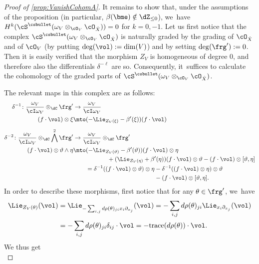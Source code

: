 \begin{proof}[Proof of \cref{prop:VanishCohomA}]
It remains to show that, under the assumptions of the pro\-position (in particular, $\beta(\bme)\notin \dZ_{\leq 0}$), we~have $H^k(\cS^{\csbullet}(\omega_V\otimes_{\cO_V} \cO_{\hat{X}}))=0$ for $k=0,-1$. Let us first notice that the complex $\cS^{\csbullet}(\omega_V\otimes_{\cO_V}\cO_{\hat{X}})$
is naturally graded by the grading of $\cO_{\hat{X}}$ and of $\cO_V$ (by putting $\deg(\vol):=\dim(V)$) and by setting $\deg(\frg'):=0$.
Then it is easily verified that the morphism $Z_V$ is homogeneous of degree $0$, and therefore also the differentials $\delta^{-\ell}$ are so. Consequently, it~suffices to calculate the cohomology of the graded parts of $\cS^{\csbullet}(\omega_V\otimes_{\cO_V}\cO_{\hat{X}})$.

The relevant maps in this complex are as follows:
\begin{align*}
\delta^{-1} \colon \frac{\omega_V}{\cI\omega_V}\otimes_\dC \frg'
&\to
\frac{\omega_V}{\cI\omega_V}
\\
(f\cdot \vol)\otimes \xi & \mto (-\Lie_{Z_V(\xi)}-\beta'(\xi))(f\cdot \vol)
\\[5pt]
\delta^{-2} \colon \frac{\omega_V}{\cI\omega_V}\otimes_\dC \bigwedge^2 \frg'
&\to
\frac{\omega_V}{\cI\omega_V}\otimes_\dC \frg'
\\
(f\cdot \vol)\otimes\vartheta\wedge\eta &\mto
(-\Lie_{Z_V(\vartheta)}-\beta'(\vartheta))(f\cdot \vol)\otimes \eta
\\
&
\hspace*{2cm}+(\Lie_{Z_V(\eta)}+\beta'(\eta))(f\cdot \vol)\otimes \vartheta -(f\cdot \vol)\otimes[\vartheta,\eta] \\
&\hphantom{\mto}=
\delta^{-1}((f\cdot\vol)\otimes\vartheta)\otimes\eta - \delta^{-1}((f\cdot\vol)\otimes\eta)\otimes\vartheta\\
&
\hphantom{{} \mto =\delta^{-1}((f\cdot\vol)\otimes\vartheta)\otimes\eta}-(f\cdot \vol)\otimes[\vartheta,\eta].
\end{align*}
In order to describe these morphisms, first notice that for any $\theta\in\frg'$, we~have
\begin{align*}
\Lie_{Z_V(\theta)}(\vol)& =
\Lie_{-\sum_{i,j}d\rho(\theta)_{ji}x_i\partial_{x_j}}(\vol)=
-\sum_{i,j}d\rho(\theta)_{ji}\Lie_{x_i\partial_{x_j}}(\vol)\\
&=
-\sum_{i,j}d\rho(\theta)_{ji}\delta_{ij} \cdot \vol=
-\textup{trace}(d\rho(\theta)) \cdot \vol.
\end{align*}
We thus get
\begin{equation}\label{eq:CancelLieVolTrace}

\end{equation}
\end{proof}
